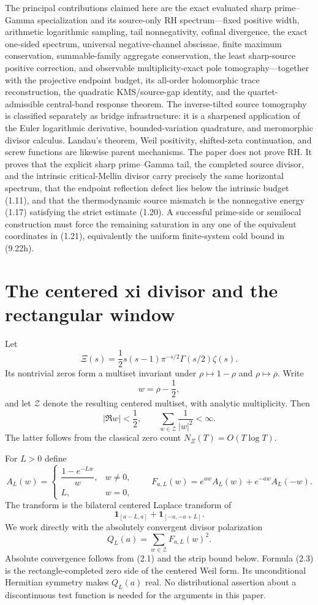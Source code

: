 \documentclass[11pt]{article}
\newcommand{\XiR}{\Xi}
\newcommand{\cZ}{\mathcal Z}
\begin{document}
The principal contributions claimed here are the exact evaluated sharp prime--Gamma
specialization and its source-only RH spectrum---fixed positive width, arithmetic
logarithmic sampling, tail nonnegativity, cofinal divergence, the exact one-sided spectrum,
universal negative-channel abscissae, finite maximum conservation, summable-family aggregate
conservation, the least sharp-source positive correction, and observable multiplicity-exact pole
tomography---together with the projective endpoint budget, its all-order holomorphic trace
reconstruction, the quadratic KMS/source-gap identity, and the quartet-admissible central-band
response theorem.  The inverse-tilted source
tomography is classified separately as bridge infrastructure: it is a sharpened application of
the Euler logarithmic derivative, bounded-variation quadrature, and meromorphic divisor calculus.
Landau's theorem, Weil positivity, shifted-zeta continuation, and screw functions are likewise
parent mechanisms.  The paper does not prove RH.  It proves that the explicit sharp
prime--Gamma tail, the completed source divisor, and the intrinsic critical-Mellin divisor carry
precisely the same horizontal spectrum, that the endpoint reflection defect lies below the
intrinsic budget \textup{(1.11)}, and that the thermodynamic source mismatch is the nonnegative
energy \textup{(1.17)} satisfying the strict estimate \textup{(1.20)}.  A successful prime-side
or semilocal construction must force the remaining saturation in any one of the equivalent
coordinates in \textup{(1.21)}, equivalently the uniform finite-system cold bound in
\textup{(9.22h)}.

\section{The centered xi divisor and the rectangular window}

Let
\[
  \XiR(s)=\frac12s(s-1)\pi^{-s/2}\Gamma(s/2)\zeta(s).
\]
Its nontrivial zeros form a multiset invariant under $\rho\mapsto1-\rho$ and
$\rho\mapsto\overline\rho$.  Write
\[
  w=\rho-\frac12,
\]
and let $\cZ$ denote the resulting centered multiset, with analytic multiplicity.  Then
\[
  |\Re w|<\frac12,\qquad
  \sum_{w\in\cZ}\frac1{|w|^2}<\infty.
  \tag{2.1}
\]
The latter follows from the classical zero count $N_\Xi(T)=O(T\log T)$.

For $L>0$ define
\[
  A_L(w)=
  \begin{cases}
  \dfrac{1-e^{-Lw}}{w},&w\ne0,\\[6pt]
  L,&w=0,
  \end{cases}
  \qquad
  F_{a,L}(w)=e^{aw}A_L(w)+e^{-aw}A_L(-w).
  \tag{2.2}
\]
The transform is the bilateral centered Laplace transform of
\[
  \mathbf 1_{[a-L,a]}+\mathbf 1_{[-a,-a+L]}.
\]
We work directly with the absolutely convergent divisor polarization
\[
  Q_L(a)=\sum_{w\in\cZ}F_{a,L}(w)^2.
  \tag{2.3}
\]
Absolute convergence follows from (2.1) and the strip bound below.  Formula (2.3) is the
rectangle-completed zero side of the centered Weil form.  Its unconditional Hermitian symmetry
makes $Q_L(a)$ real.  No distributional assertion about a
discontinuous test function is needed for the arguments in this paper.
\end{document}
